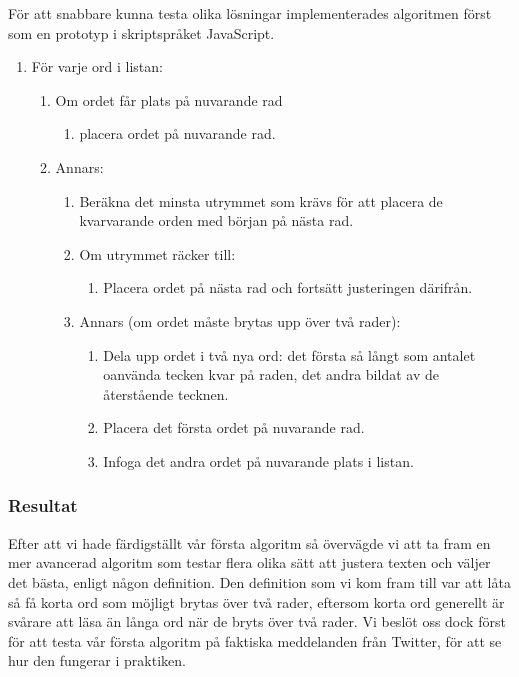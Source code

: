 \documentclass[a4paper,11pt]{article}
\begin{document}
För att snabbare kunna testa olika lösningar implementerades algoritmen först som en prototyp i skriptspråket JavaScript.
	\begin{enumerate}
    	\item För varje ord i listan:
    		\begin{enumerate}
        	\item Om ordet får plats på nuvarande rad
        		\begin{enumerate}
        		\item placera ordet på nuvarande rad.
        		\end{enumerate}
        	\item Annars: 
        		\begin{enumerate}
        		\item Beräkna det minsta utrymmet som krävs för att placera de kvarvarande orden med början på nästa rad. 
        		\item Om utrymmet räcker till:
        			\begin{enumerate}
        			\item Placera ordet på nästa rad och fortsätt justeringen därifrån.
        			\end{enumerate}
            		\item Annars (om ordet måste brytas upp över två rader):
            			\begin{enumerate}
                		\item Dela upp ordet i två nya ord: det första så långt som antalet oanvända tecken kvar på raden, det andra bildat av de återstående tecknen.
                		\item Placera det första ordet på nuvarande rad.
                		\item Infoga det andra ordet på nuvarande plats i listan.
                		\end{enumerate}
                	\end{enumerate}
    		\end{enumerate}
    	\end{enumerate}

\subsubsection{Resultat}
Efter att vi hade färdigställt vår första algoritm så övervägde vi att ta fram en mer avancerad algoritm som testar flera olika sätt att justera texten och väljer det bästa, enligt någon definition. Den definition som vi kom fram till var att låta så få korta ord som möjligt brytas över två rader, eftersom korta ord generellt är svårare att läsa än långa ord när de bryts över två rader. Vi beslöt oss dock först för att testa vår första algoritm på faktiska meddelanden från Twitter, för att se hur den fungerar i praktiken. \\
\end{document}
